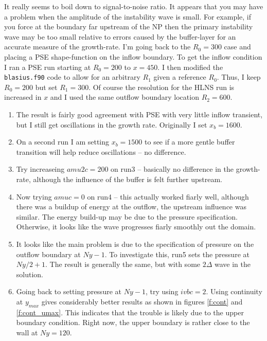 \documentclass[12pt]{article}
\begin{document}
It really seems to boil down to signal-to-noise ratio.  It appears that you
may have a problem when the amplitude of the instability wave is small.  For
example, if you force at the boundary far upstream of the NP then the primary
instability wave may be too small relative to errors caused by the
buffer-layer for an accurate measure of the growth-rate.  I'm going back to
the $R_0=300$ case and placing a PSE shape-function on the inflow boundary.
To get the inflow condition I ran a PSE run starting at $R_0=200$ to $x=450$.
I then modified the {\tt blasius.f90} code to allow for an arbitrary $R_1$
given a reference $R_0$.  Thus, I keep $R_0=200$ but set $R_1=300$.  Of course
the resolution for the HLNS run is increased in $x$ and I used the same
outflow boundary location $R_2=600$.  
%
\begin{enumerate}

\item The result is fairly good agreement with PSE with very little inflow
transient, but I still get oscillations in the growth rate.  Originally I set
$x_b=1600$.

\item On a second run I am setting $x_b=1500$ to see if a more gentle buffer
transition will help reduce oscillations -- no difference.

\item Try increaseing $amu2c = 200$ on run3 -- basically no difference in the
growth-rate, although the influence of the buffer is felt further upstream.

\item Now trying $amuc=0$ on run4 -- this actually worked fiarly well,
although there was a buildup of energy at the outflow, the upstream influence
was similar.  The energy build-up may be due to the pressure specification.
Otherwise, it looks like the wave progresses fiarly smoothly out the domain.

\item It looks like the main problem is due to the specification of pressure on
the outflow boundary at $Ny-1$.  To investigate this, run5 sets the pressure
at $Ny/2+1$.  The result is generally the same, but with some $2\Delta$ wave
in the solution.

\item Going back to setting pressure at $Ny-1$, try using $ivbc=2$.  Using
continuity at $y_{max}$ gives considerably better results as shown in figures
\ref{f:cont} and \ref{f:cont_umax}.  This indicates that the trouble is likely
due to the upper boundary condition.  Right now, the upper boundary is rather
close to the wall at $Ny=120$.


\end{enumerate}
\end{document}
